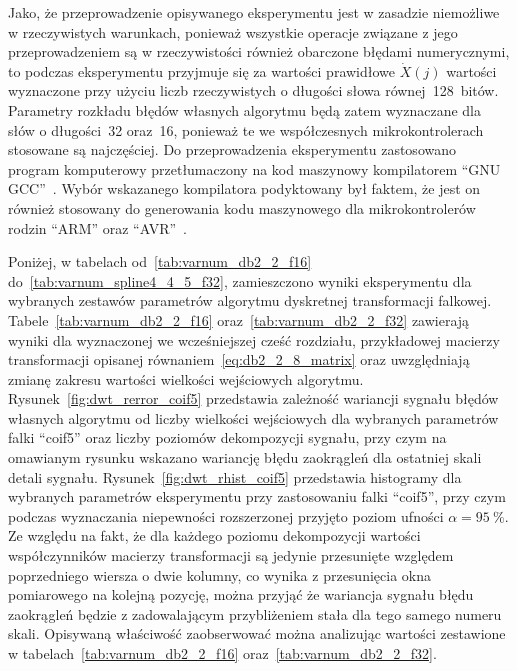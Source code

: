 Jako, że przeprowadzenie opisywanego eksperymentu jest w zasadzie niemożliwe w rzeczywistych warunkach, ponieważ wszystkie operacje związane z jego przeprowadzeniem są w rzeczywistości również obarczone błędami numerycznymi, to podczas eksperymentu przyjmuje się za wartości prawidłowe $\dot{X}(j)$ wartości wyznaczone przy użyciu liczb rzeczywistych o długości słowa równej~\qty{128}{bitów}. Parametry rozkładu błędów własnych algorytmu będą zatem wyznaczane dla słów o długości~\qty{32}{\bitOw} oraz~\qty{16}{\bitOw}, ponieważ te we współczesnych mikrokontrolerach stosowane są najczęściej. Do przeprowadzenia eksperymentu zastosowano program komputerowy przetłumaczony na kod maszynowy kompilatorem \enquote{GNU GCC}~\cite{gcc_manual}. Wybór wskazanego kompilatora podyktowany był faktem, że jest on również stosowany do generowania kodu maszynowego dla mikrokontrolerów rodzin \enquote{ARM} oraz \enquote{AVR}~\cite{kim_compilers}.

Poniżej, w tabelach od~\ref{tab:varnum_db2_2_f16} do~\ref{tab:varnum_spline4_4_5_f32}, zamieszczono wyniki eksperymentu dla wybranych zestawów parametrów algorytmu dyskretnej transformacji falkowej. Tabele~\ref{tab:varnum_db2_2_f16} oraz~\ref{tab:varnum_db2_2_f32} zawierają wyniki dla wyznaczonej we wcześniejszej cześć rozdziału, przykładowej macierzy transformacji opisanej równaniem~\eqref{eq:db2_2_8_matrix} oraz uwzględniają zmianę zakresu wartości wielkości wejściowych algorytmu. Rysunek~\ref{fig:dwt_rerror_coif5} przedstawia zależność wariancji sygnału błędów własnych algorytmu od liczby wielkości wejściowych dla wybranych parametrów falki \enquote{coif5} oraz liczby poziomów dekompozycji sygnału, przy czym na omawianym rysunku wskazano wariancję błędu zaokrągleń dla ostatniej skali detali sygnału. Rysunek~\ref{fig:dwt_rhist_coif5} przedstawia histogramy dla wybranych parametrów eksperymentu przy zastosowaniu falki \enquote{coif5}, przy czym podczas wyznaczania niepewności rozszerzonej przyjęto poziom ufności $\alpha = \qty{95}{\percent}$. Ze względu na fakt, że dla każdego poziomu dekompozycji wartości współczynników macierzy transformacji są jedynie przesunięte względem poprzedniego wiersza o dwie kolumny, co wynika z przesunięcia okna pomiarowego na kolejną pozycję, można przyjąć że wariancja sygnału błędu zaokrągleń będzie z zadowalającym przybliżeniem stała dla tego samego numeru skali. Opisywaną właściwość zaobserwować można analizując wartości zestawione w tabelach~\ref{tab:varnum_db2_2_f16} oraz~\ref{tab:varnum_db2_2_f32}.

